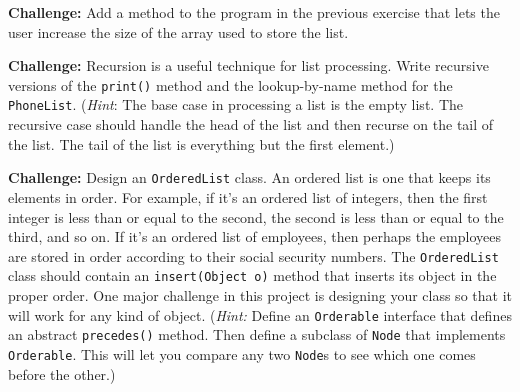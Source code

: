 \begin{EXRtwo}
\item  {\bf Challenge:} Add a method to the program in the previous
exercise that lets the user increase the size of the array used to
store the list.

\item  {\bf Challenge:} Recursion is a useful technique for list processing.
Write recursive versions of the {\tt print()} method and the lookup-by-name
method for the {\tt PhoneList}. ({\it Hint}: The base case in processing
a list is the empty list.  The recursive case should handle the head of
the list and then recurse on the tail of the list.  The tail of the
list is everything but the first element.)


\item  {\bf Challenge:} Design an {\tt OrderedList} class.  An ordered
list is one that keeps its elements in order.  For example, if it's an
ordered list of integers, then the first integer is less than or equal
to the second, the second is less than or equal to the third, and so
on.  If it's an ordered list of employees, then perhaps the employees
are stored in order according to their social security numbers.  The
{\tt OrderedList} class should contain an {\tt insert(Object o)}
method that inserts its object in the proper order.  One major
challenge in this project is designing your class so that it will work
for any kind of object.  ({\it Hint:} Define an {\tt Orderable} interface
that defines an abstract {\tt precedes()} method.  Then
define a subclass of {\tt Node} that implements {\tt Orderable}. This
will let you compare any two {\tt Node}s to see which one comes before
the other.)
\end{EXRtwo}
%